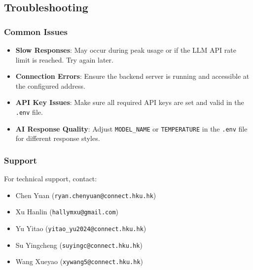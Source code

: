 \subsection{Troubleshooting}

\subsubsection{Common Issues}
\begin{itemize}
    \item \textbf{Slow Responses}: May occur during peak usage or if the LLM API rate limit is reached. Try again later.
    \item \textbf{Connection Errors}: Ensure the backend server is running and accessible at the configured address.
    \item \textbf{API Key Issues}: Make sure all required API keys are set and valid in the \texttt{.env} file.
    \item \textbf{AI Response Quality}: Adjust \texttt{MODEL_NAME} or \texttt{TEMPERATURE} in the \texttt{.env} file for different response styles.
\end{itemize}

\subsubsection{Support}
For technical support, contact:
\begin{itemize}
    \item Chen Yuan (\texttt{ryan.chenyuan@connect.hku.hk})
    \item Xu Hanlin (\texttt{hallymxu@gmail.com})
    \item Yu Yitao (\texttt{yitao_yu2024@connect.hku.hk})
    \item Su Yingcheng (\texttt{suyingc@connect.hku.hk})
    \item Wang Xueyao (\texttt{xywang5@connect.hku.hk})
\end{itemize}